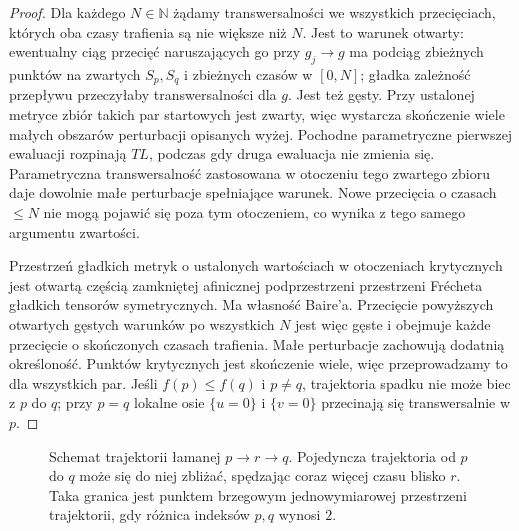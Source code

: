 \begin{proof}
Dla każdego $N\in\mathbb N$ żądamy transwersalności
we wszystkich przecięciach, których oba czasy
trafienia są nie większe niż $N$.
Jest to warunek otwarty: ewentualny ciąg przecięć
naruszających go przy $g_j\to g$ ma podciąg
zbieżnych punktów na zwartych $S_p,S_q$
i zbieżnych czasów w $[0,N]$; gładka zależność
przepływu przeczyłaby transwersalności dla $g$.
Jest też gęsty. Przy ustalonej metryce zbiór
takich par startowych jest zwarty, więc wystarcza
skończenie wiele małych obszarów perturbacji
opisanych wyżej. Pochodne parametryczne pierwszej
ewaluacji rozpinają $TL$, podczas gdy druga
ewaluacja nie zmienia się. Parametryczna
transwersalność zastosowana w otoczeniu tego
zwartego zbioru daje dowolnie małe perturbacje
spełniające warunek. Nowe przecięcia o czasach
$\leq N$ nie mogą pojawić się poza tym otoczeniem,
co wynika z tego samego argumentu zwartości.

Przestrzeń gładkich metryk o ustalonych wartościach
w otoczeniach krytycznych jest otwartą częścią
zamkniętej afinicznej podprzestrzeni przestrzeni
Fr\'echeta gładkich tensorów symetrycznych.
Ma własność Baire'a. Przecięcie powyższych
otwartych gęstych warunków po wszystkich $N$
jest więc gęste i obejmuje każde przecięcie
o skończonych czasach trafienia.
Małe perturbacje zachowują dodatnią określoność.
Punktów krytycznych jest
skończenie wiele, więc
przeprowadzamy to dla
wszystkich par. Jeśli
$f(p)\leq f(q)$ i $p\ne q$,
trajektoria spadku nie może
biec z $p$ do $q$;
przy $p=q$ lokalne osie
$\{u=0\}$ i $\{v=0\}$
przecinają się transwersalnie
w $p$.
\end{proof}

\begin{figure}[htbp]
\centering
{}
\caption{Schemat trajektorii łamanej $p\to r\to q$.
Pojedyncza trajektoria od $p$ do $q$
może się do niej zbliżać, spędzając
coraz więcej czasu blisko $r$.
Taka granica jest punktem brzegowym
jednowymiarowej przestrzeni trajektorii,
gdy różnica indeksów $p,q$ wynosi $2$.}
\label{fig:lamane-trajektorie-morse-17}
\end{figure}

